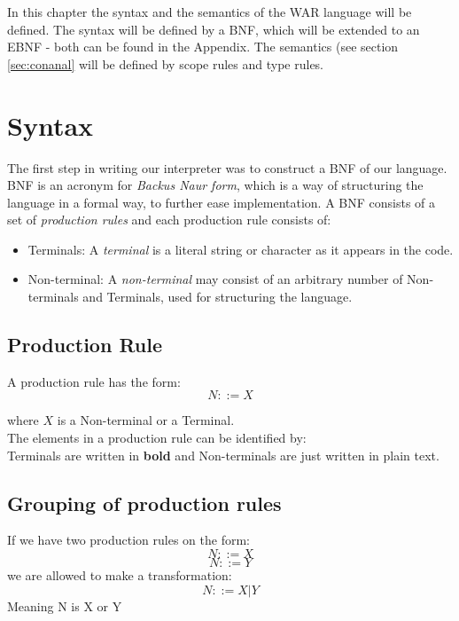 In this chapter the syntax and the semantics of the WAR language will be defined. The syntax will be defined by a BNF, which will be extended to an EBNF - both can be found in the Appendix. The semantics (see section \ref{sec:conanal} will be defined by scope rules and type rules.
\section{Syntax}
	The first step in writing our interpreter was to construct a BNF of our language. 
	BNF is an acronym for {\it Backus Naur form}, which is a way of
	structuring the language in a formal way, to further ease implementation. 
	A BNF consists of a set of {\it production rules} and each
	production rule consists of: \\
	\begin{itemize}
		 \item Terminals: A {\it terminal } is a literal string or character as it appears in the code.
		 \item Non-terminal: A {\it non-terminal } may consist of an arbitrary number of Non-terminals and Terminals, used for structuring the language.
	\end{itemize}
	
	\subsection*{Production Rule}
		A production rule has the form: \\
		\begin{equation}
			N ::= X
		\end{equation}
		
		where $X$ is a Non-terminal or a Terminal. \\
		
		The elements in a production rule can be identified by: \\
		Terminals are written in {\bf bold } and 
		Non-terminals are just written in plain text.
	\subsection*{Grouping of production rules}
		If we have two production rules on the form:\\
		\begin{equation}
			N ::= X 
		\end{equation}
		\begin{equation}
			N ::= Y 
		\end{equation}
		we are allowed to make a transformation: \\
		\begin{equation}
			N ::= X | Y 
		\end{equation}
		Meaning N is X or Y \\
		
